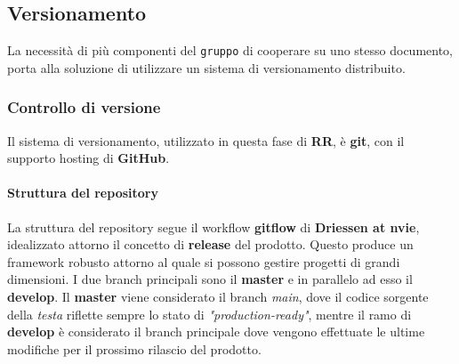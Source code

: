 \subsection{Versionamento}
La necessità di più componenti del \texttt{gruppo} di cooperare su uno stesso documento, porta alla soluzione di utilizzare un sistema di versionamento distribuito. 


\subsubsection{Controllo di versione}
Il sistema di versionamento, utilizzato in questa fase di \textbf{RR}, è \textbf{git}, con il supporto hosting di \textbf{GitHub}.

	\paragraph{Struttura del repository} 
La struttura del repository segue il workflow \textbf{gitflow} di \textbf{Driessen at nvie}, idealizzato attorno il concetto di \textbf{release} del prodotto. Questo produce
un framework robusto attorno al quale si possono gestire progetti di grandi dimensioni. I due branch principali sono il \textbf{master} e in parallelo ad esso il \textbf{develop}. 
Il \textbf{master} viene considerato il branch \textit{main}, dove il codice sorgente della \textit{testa} riflette sempre lo stato di \textit{"production-ready"},
mentre il ramo di \textbf{develop} è considerato il branch principale dove vengono effettuate le ultime modifiche per il prossimo rilascio del prodotto. 


